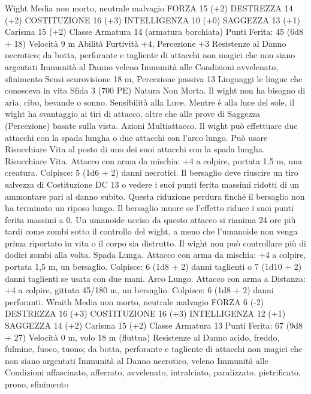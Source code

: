 \begin{multicols}{2}
Wight
Media non morto, neutrale malvagio
FORZA 15 (+2)
DESTREZZA 14 (+2)
COSTITUZIONE 16 (+3)
INTELLIGENZA 10 (+0)
SAGGEZZA 13 (+1)
Carisma 15 (+2)
Classe Armatura 14 (armatura borchiata)
\hspace*{0pt}\hfill{Punti Ferita}: 45 (6d8 + 18)
Velocità 9 m
Abilità Furtività +4, Percezione +3
Resistenze al Danno necrotico; da botta, perforante e
tagliente di attacchi non magici che non siano argentati
Immunità al Danno veleno
Immunità alle Condizioni avvelenato, sfinimento
Sensi scurovisione 18 m, Percezione passiva 13
Linguaggi le lingue che conosceva in vita
Sfida 3 (700 PE)
Natura Non Morta. Il wight non ha bisogno di aria, cibo,
bevande o sonno.
Sensibilità alla Luce. Mentre è alla luce del sole, il wight ha
svantaggio ai tiri di attacco, oltre che alle prove di Saggezza
(Percezione) basate sulla vista.
Azioni
Multiattacco. Il wight può effettuare due attacchi con la spada
lungha o due attacchi con l’arco lungo. Può usare Risucchiare
Vita al posto di uno dei suoi attacchi con la spada lungha.
Risucchiare Vita. Attacco con arma da mischia: +4 a colpire,
portata 1,5 m, una creatura.
Colpisce: 5 (1d6 + 2) danni necrotici. Il bersaglio deve riuscire
un tiro salvezza di Costituzione DC 13 o vedere i suoi punti
ferita massimi ridotti di un ammontare pari al danno subito.
Questa riduzione perdura finché il bersaglio non ha terminato un
riposo lungo. Il bersaglio muore se l’effetto riduce i suoi punti
ferita massimi a 0.
Un umanoide ucciso da questo attacco si rianima 24 ore più tardi
come zombi sotto il controllo del wight, a meno che l’umanoide
non venga prima riportato in vita o il corpo sia distrutto. Il wight
non può controllare più di dodici zombi alla volta.
Spada Lunga. Attacco con arma da mischia: +4 a colpire,
portata 1,5 m, un bersaglio.
Colpisce: 6 (1d8 + 2) danni taglienti o 7 (1d10 + 2) danni
taglienti se usata con due mani.
Arco Lungo. Attacco con arma a Distanza: +4 a colpire, gittata
45/180 m, un bersaglio.
Colpisce: 6 (1d8 + 2) danni perforanti.
Wraith
Media non morto, neutrale malvagio
FORZA 6 (-2)
DESTREZZA 16 (+3)
COSTITUZIONE 16 (+3)
INTELLIGENZA 12 (+1)
SAGGEZZA 14 (+2)
Carisma 15 (+2)
Classe Armatura 13
\hspace*{0pt}\hfill{Punti Ferita}: 67 (9d8 + 27)
Velocità 0 m, volo 18 m (fluttua)
Resistenze al Danno acido, freddo, fulmine, fuoco, tuono;
da botta, perforante e tagliente di attacchi non magici che
non siano argentati
Immunità al Danno necrotico, veleno
Immunità alle Condizioni affascinato, afferrato, avvelenato,
intralciato, paralizzato, pietrificato, prono, sfinimento

\end{multicols}
